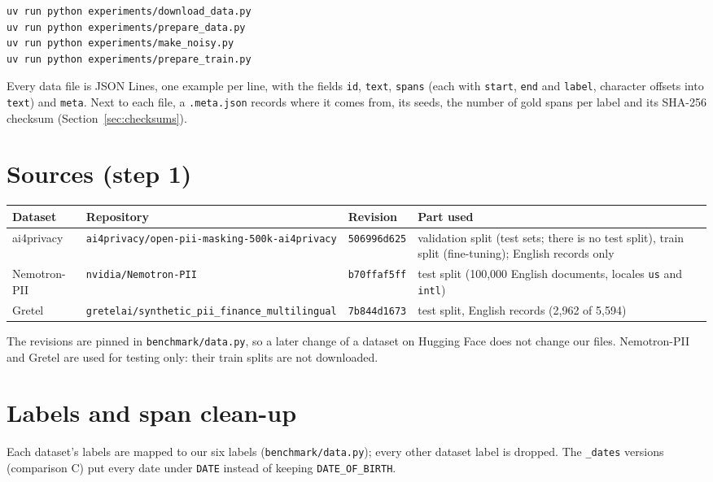 \documentclass[10pt,a4paper]{article}
\newcommand{\file}[1]{\texttt{#1}}
\begin{document}
{\small
\begin{verbatim}
uv run python experiments/download_data.py
uv run python experiments/prepare_data.py
uv run python experiments/make_noisy.py
uv run python experiments/prepare_train.py
\end{verbatim}
}

Every data file is JSON Lines, one example per line, with the fields \file{id}, \file{text},
\file{spans} (each with \file{start}, \file{end} and \file{label}, character offsets into
\file{text}) and \file{meta}. Next to each file, a \file{.meta.json} records where it comes from, its seeds, the
number of gold spans per label and its SHA-256 checksum (Section~\ref{sec:checksums}).

\section{Sources (step 1)}

\begin{tabularx}{\linewidth}{@{}lllL@{}}
\toprule
Dataset & Repository & Revision & Part used \\
\midrule
ai4privacy & \file{ai4privacy/open-pii-masking-500k-ai4privacy} & \file{506996d625} & validation split (test sets; there is no test split), train split (fine-tuning); English records only \\
Nemotron-PII & \file{nvidia/Nemotron-PII} & \file{b70ffaf5ff} & test split (100,000 English documents, locales \file{us} and \file{intl}) \\
Gretel & \file{gretelai/synthetic\_pii\_finance\_multilingual} & \file{7b844d1673} & test split, English records (2,962 of 5,594) \\
\bottomrule
\end{tabularx}

The revisions are pinned in \file{benchmark/data.py}, so a later change of a dataset on Hugging
Face does not change our files. Nemotron-PII and Gretel are used for testing only: their train
splits are not downloaded.

\section{Labels and span clean-up}

Each dataset's labels are mapped to our six labels (\file{benchmark/data.py}); every other
dataset label is dropped. The \file{\_dates} versions (comparison C) put every date under
\file{DATE} instead of keeping \file{DATE\_OF\_BIRTH}.
\end{document}
